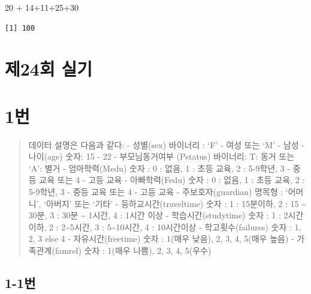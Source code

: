 \documentclass[
  letterpaper,
  DIV=11,
  numbers=noendperiod]{scrreprt}
\newenvironment{Shaded}{\begin{snugshade}}{\end{snugshade}}
\newcommand{\DecValTok}[1]{\textcolor[rgb]{0.68,0.00,0.00}{#1}}
\newcommand{\SpecialCharTok}[1]{\textcolor[rgb]{0.37,0.37,0.37}{#1}}
\begin{document}
\begin{Shaded}
\begin{Highlighting}[]
\DecValTok{20} \SpecialCharTok{+} \DecValTok{14}\SpecialCharTok{+}\DecValTok{11}\SpecialCharTok{+}\DecValTok{25}\SpecialCharTok{+}\DecValTok{30}
\end{Highlighting}
\end{Shaded}

\begin{verbatim}
[1] 100
\end{verbatim}

\hypertarget{uxc81c24uxd68c-uxc2e4uxae30}{%
\chapter*{제24회 실기}\label{uxc81c24uxd68c-uxc2e4uxae30}}


\hypertarget{uxbc88-60}{%
\chapter*{1번}\label{uxbc88-60}}


\begin{quote}
데이터 설명은 다음과 같다: - 성별(sex) 바이너리 : `F' - 여성 또는 `M' -
남성 - 나이(age) 숫자: 15 - 22 - 부모님동거여부 (Pstatus) 바이너리: T:
동거 또는 `A': 별거 - 엄마학력(Medu) 숫자 : 0 : 없음, 1 : 초등 교육, 2 :
5-9학년, 3 - 중등 교육 또는 4 - 고등 교육 - 아빠학력(Fedu) 숫자 : 0 :
없음, 1 : 초등 교육, 2 : 5-9학년, 3 - 중등 교육 또는 4 - 고등 교육 -
주보호자(guardian) 명목형 : `어머니', `아버지' 또는 `기타' -
등하교시간(traveltime) 숫자 : 1 : 15분이하, 2 : 15 \textasciitilde{}
30분, 3 : 30분 \textasciitilde{} 1시간, 4 : 1시간 이상 -
학습시간(studytime) 숫자 : 1 : 2시간이하, 2 : 2\textasciitilde5시간, 3 :
5\textasciitilde10시간, 4 : 10시간이상 - 학고횟수(failures) 숫자 : 1, 2,
3 else 4 - 자유시간(freetime) 숫자 : 1(매우 낮음), 2, 3, 4, 5(매우 높음)
- 가족관계(famrel) 숫자 : 1(매우 나쁨), 2, 3, 4, 5(우수)
\end{quote}

\hypertarget{uxbc88-61}{%
\section*{1-1번}\label{uxbc88-61}}
\end{document}
